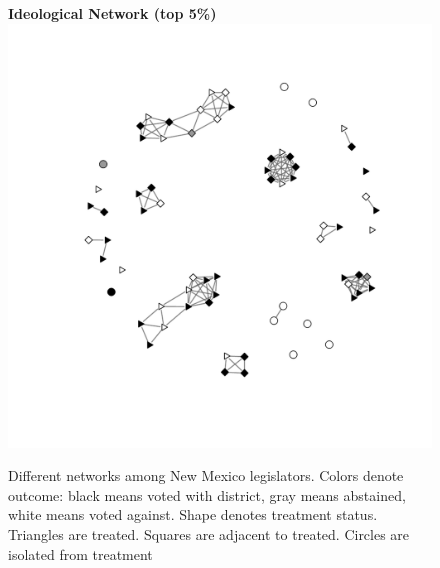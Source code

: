 \documentclass[12pt]{article}
\begin{document}
\begin{figure}
\begin{tabular}{cc}
\end{tabular}
{\bf Ideological Network (top 5\%)} \\
\includegraphics[scale=.55, clip=true,trim =2cm 2cm 2cm 2cm]{./images/coppock_ideological_net.pdf}
\caption{Different networks among New Mexico legislators. Colors denote outcome: black means voted with district, gray means abstained, white means voted against. Shape denotes treatment status. Triangles are treated. Squares are adjacent to treated. Circles are isolated from treatment}
\label{fig:nh-nets}
\end{figure}




\clearpage


\end{document}
